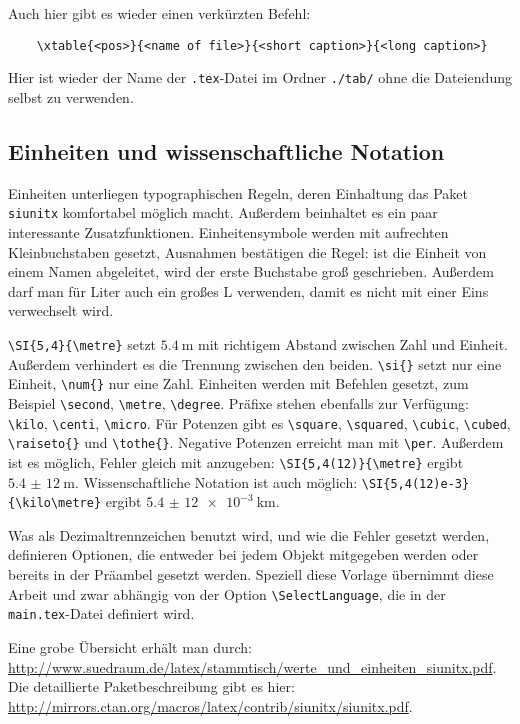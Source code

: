 Auch hier gibt es wieder einen verkürzten Befehl:
\begin{verbatim}
	\xtable{<pos>}{<name of file>}{<short caption>}{<long caption>}
\end{verbatim}
Hier ist wieder der Name der \verb|.tex|-Datei im Ordner \verb|./tab/| ohne die Dateiendung selbst zu verwenden.


\subsection{Einheiten und wissenschaftliche Notation}
Einheiten unterliegen typographischen Regeln, deren Einhaltung das Paket \verb|siunitx| komfortabel möglich macht. Außerdem beinhaltet es ein paar interessante Zusatzfunktionen. Einheitensymbole werden mit aufrechten Kleinbuchstaben gesetzt, Ausnahmen bestätigen die Regel: ist die Einheit von einem Namen abgeleitet, wird der erste Buchstabe groß geschrieben. Außerdem darf man für Liter auch ein großes L verwenden, damit es nicht mit einer Eins verwechselt wird.

\verb|\SI{5,4}{\metre}| setzt $\SI{5,4}{\metre}$ mit richtigem Abstand zwischen Zahl und Einheit. Außerdem verhindert es die Trennung zwischen den beiden. \verb|\si{}| setzt nur eine Einheit, \verb|\num{}| nur eine Zahl. Einheiten werden mit Befehlen gesetzt, zum Beispiel \verb|\second|, \verb|\metre|, \verb|\degree|. Präfixe stehen ebenfalls zur Verfügung: \verb|\kilo|, \verb|\centi|, \verb|\micro|. Für Potenzen gibt es \verb|\square|, \verb|\squared|, \verb|\cubic|, \verb|\cubed|, \verb|\raiseto{}| und \verb|\tothe{}|. Negative Potenzen erreicht man mit \verb|\per|. Außerdem ist es möglich, Fehler gleich mit anzugeben: \verb|\SI{5,4(12)}{\metre}| ergibt $\SI{5,4(12)}{\metre}$. Wissenschaftliche Notation ist auch möglich: \verb|\SI{5,4(12)e-3}{\kilo\metre}| ergibt $\SI{5,4(12)e-3}{\kilo\metre}$.

Was als Dezimaltrennzeichen benutzt wird, und wie die Fehler gesetzt werden, definieren Optionen, die entweder bei jedem Objekt mitgegeben werden oder bereits in der Präambel gesetzt werden. Speziell diese Vorlage übernimmt diese Arbeit und zwar abhängig von der Option \verb|\SelectLanguage|, die in der \verb|main.tex|-Datei definiert wird.

Eine grobe Übersicht erhält man durch: \url{http://www.suedraum.de/latex/stammtisch/werte_und_einheiten_siunitx.pdf}. Die detaillierte Paketbeschreibung gibt es hier: \url{http://mirrors.ctan.org/macros/latex/contrib/siunitx/siunitx.pdf}.
